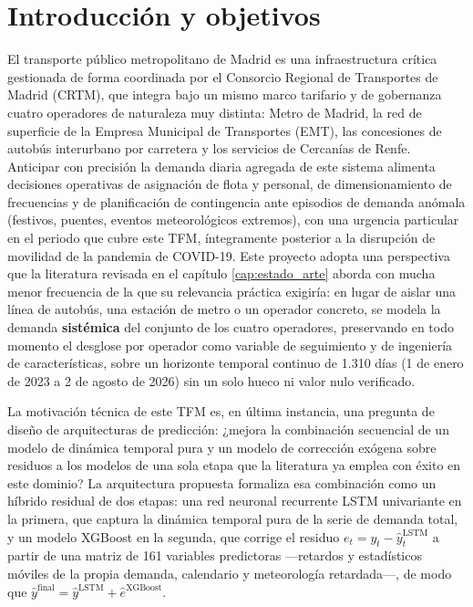 \chapter{Introducción y objetivos}\label{cap:introduccion}

El transporte público metropolitano de Madrid es una infraestructura crítica gestionada
de forma coordinada por el Consorcio Regional de Transportes de Madrid (CRTM), que integra
bajo un mismo marco tarifario y de gobernanza cuatro operadores de naturaleza muy
distinta: Metro de Madrid, la red de superficie de la Empresa Municipal de Transportes
(EMT), las concesiones de autobús interurbano por carretera y los servicios de Cercanías
de Renfe. Anticipar con precisión la demanda diaria agregada de este sistema alimenta
decisiones operativas de asignación de flota y personal, de dimensionamiento de
frecuencias y de planificación de contingencia ante episodios de demanda anómala
(festivos, puentes, eventos meteorológicos extremos), con una urgencia particular en el
periodo que cubre este TFM, íntegramente posterior a la disrupción de movilidad de la
pandemia de COVID-19. Este proyecto adopta una perspectiva que la literatura revisada en
el capítulo \ref{cap:estado_arte} aborda con mucha menor frecuencia de la que su
relevancia práctica exigiría: en lugar de aislar una línea de autobús, una estación de
metro o un operador concreto, se modela la demanda \textbf{sistémica} del conjunto de los
cuatro operadores, preservando en todo momento el desglose por operador como variable de
seguimiento y de ingeniería de características, sobre un horizonte temporal continuo de
1.310 días (1 de enero de 2023 a 2 de agosto de 2026) sin un solo hueco ni valor nulo
verificado.

La motivación técnica de este TFM es, en última instancia, una pregunta de diseño de
arquitecturas de predicción: ¿mejora la combinación secuencial de un modelo de dinámica
temporal pura y un modelo de corrección exógena sobre residuos a los modelos de una sola
etapa que la literatura ya emplea con éxito en este dominio? La arquitectura propuesta
formaliza esa combinación como un híbrido residual de dos etapas: una red neuronal
recurrente LSTM univariante en la primera, que captura la dinámica temporal pura de la
serie de demanda total, y un modelo XGBoost en la segunda, que corrige el residuo
$e_t = y_t - \hat y^{\text{LSTM}}_t$ a partir de una matriz de 161 variables predictoras
—retardos y estadísticos móviles de la propia demanda, calendario y meteorología
retardada—, de modo que
$\hat y^{\text{final}} = \hat y^{\text{LSTM}} + \hat e^{\text{XGBoost}}$.

